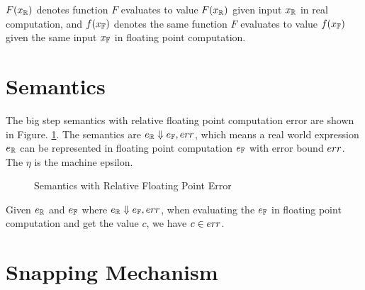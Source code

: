 \documentclass[a4paper,11pt]{article}
\begin{document}
$F(x_{\mathbb{R}})$ denotes function $F$ evaluates to value $F(x_{\mathbb{R}})$ given input $x_{\mathbb{R}}$ in real computation, and $f(x_{\mathbb{F}})$ denotes the same function $F$ evaluates to value $f(x_{\mathbb{F}})$ given the same input $x_{\mathbb{F}}$ in floating point computation.

\section{Semantics}

The big step semantics with relative floating point computation error are shown in Figure. \ref{fig_semantics_rel}. The semantics are $e_{\mathbb{R}} \Downarrow e_{\mathbb{F}}, err$, which means a real world expression $e_{\mathbb{R}}$ can be represented in floating point computation $e_{\mathbb{F}}$ with error bound $err$. The $\eta$ is the machine epsilon.

\begin{figure}
\caption{Semantics with Relative Floating Point Error}
\label{fig_semantics_rel}
\end{figure}


\begin{thm}
Given $e_{\mathbb{R}}$ and $e_{\mathbb{F}}$ where  $e_{\mathbb{R}} \Downarrow e_{\mathbb{F}}, err$, when evaluating the $e_{\mathbb{F}}$ in floating point computation and get the value $c$, we have $c \in err$.
\end{thm}




\section{Snapping Mechanism}
\end{document}
